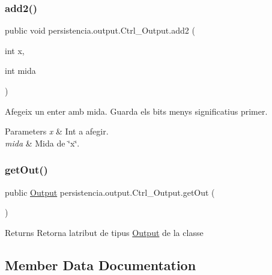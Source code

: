 \subsubsection{\texorpdfstring{add2()}{add2()}}
{\footnotesize\ttfamily public void persistencia.\+output.\+Ctrl\+\_\+\+Output.\+add2 (\begin{DoxyParamCaption}\item[{int}]{x,  }\item[{int}]{mida }\end{DoxyParamCaption})\hspace{0.3cm}{\ttfamily [inline]}}



Afegeix un enter amb mida. Guarda els bits menys significatius primer. 


\begin{DoxyParams}{Parameters}
{\em x} & Int a afegir. \\
\hline
{\em mida} & Mida de \char`\"{}x\char`\"{}. \\
\hline
\end{DoxyParams}
\mbox{\label{classpersistencia_1_1output_1_1Ctrl__Output_aa36fdf4d9efc14d95f5d0d77838c6280}} 
\subsubsection{\texorpdfstring{get\+Out()}{getOut()}}
{\footnotesize\ttfamily public \hyperlink{classpersistencia_1_1output_1_1Output}{Output} persistencia.\+output.\+Ctrl\+\_\+\+Output.\+get\+Out (\begin{DoxyParamCaption}{ }\end{DoxyParamCaption})\hspace{0.3cm}{\ttfamily [inline]}}

\begin{DoxyReturn}{Returns}
Retorna l\textquotesingle{}atribut de tipus \hyperlink{classpersistencia_1_1output_1_1Output}{Output} de la classe 
\end{DoxyReturn}


\subsection{Member Data Documentation}
\mbox{\label{classpersistencia_1_1output_1_1Ctrl__Output_adbfbc3bef074ccf06131270fb9fafd8d}} 

